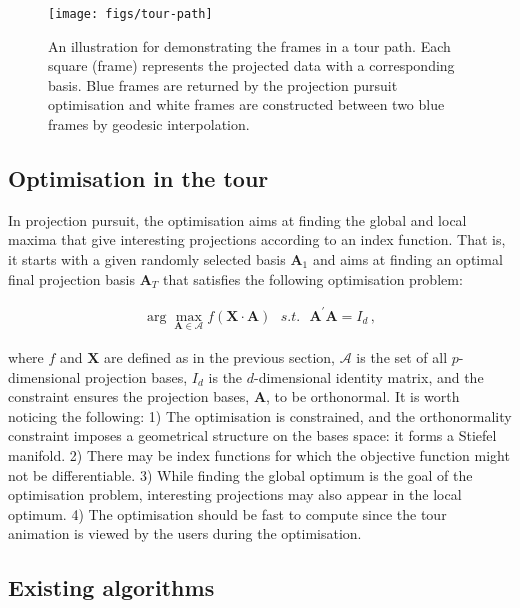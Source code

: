 \begin{figure}

{\centering \texttt{[image: figs/tour-path]} 

}

\caption{An illustration for demonstrating the frames in a tour path. Each square (frame) represents the projected data with a corresponding basis. Blue frames are returned by the projection pursuit optimisation and white frames are constructed between two blue frames by geodesic interpolation.}\label{fig:tour-path}
\end{figure}

\hypertarget{tour-optim}{%
\subsection{Optimisation in the tour}\label{tour-optim}}

In projection pursuit, the optimisation aims at finding the global and local maxima that give interesting projections according to an index function. That is, it starts with a given randomly selected basis \(\mathbf{A}_1\) and aims at finding an optimal final projection basis \(\mathbf{A}_T\) that satisfies the following optimisation problem:

\begin{align}
\arg \max_{\mathbf{A} \in \mathcal{A}} f(\mathbf{X} \cdot \mathbf{A})  ~~~ s.t. ~~~ \mathbf{A}^{\prime} \mathbf{A} = I_d \,,
\end{align}

\noindent where \(f\) and \(\mathbf{X}\) are defined as in the previous section, \(\mathcal{A}\) is the set of all \(p\)-dimensional projection bases, \(I_d\) is the \(d\)-dimensional identity matrix, and the constraint ensures the projection bases, \(\mathbf{A}\), to be orthonormal. It is worth noticing the following: 1) The optimisation is constrained, and the orthonormality constraint imposes a geometrical structure on the bases space: it forms a Stiefel manifold. 2) There may be index functions for which the objective function might not be differentiable. 3) While finding the global optimum is the goal of the optimisation problem, interesting projections may also appear in the local optimum. 4) The optimisation should be fast to compute since the tour animation is viewed by the users during the optimisation.

\hypertarget{existing-algorithms}{%
\subsection{Existing algorithms}\label{existing-algorithms}}

